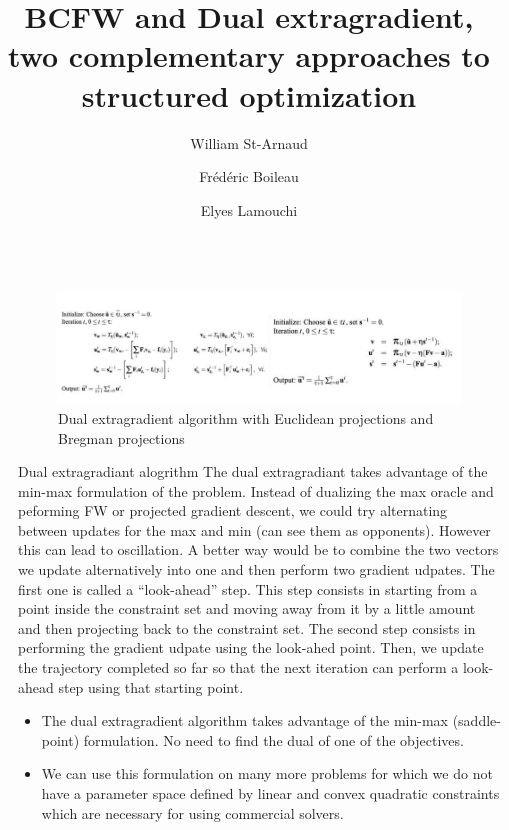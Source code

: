 \documentclass[final]{beamer}
\title{BCFW and Dual extragradient, two complementary approaches to structured optimization}
\author{William St-Arnaud\inst{1} \and Fr\'ed\'eric Boileau \inst{1} \and Elyes Lamouchi\inst{1}}
\institute[shortinst]{\inst{1} Universit\'e de Montr\'eal}
\newlength{\sepwidth}
\newlength{\colwidth}
\newcommand{\separatorcolumn}{\begin{column}{\sepwidth}\end{column}}
\begin{document}
\begin{frame}[t]
\begin{columns}[t]
\separatorcolumn

\begin{column}{\colwidth}

  \begin{block}{}

    \begin{figure}
      \includegraphics{img/extra_grad.jpg}
      \caption{Dual extragradient algorithm with Euclidean projections and Bregman projections}
      \label{extragrad}
    \end{figure}
  \end{block}


  \begin{block}{Dual extragradiant alogrithm}
    The dual extragradiant takes advantage of the min-max formulation of the
problem. Instead of dualizing the max oracle and peforming FW or projected
gradient descent, we could try alternating between updates for the max and min
(can see them as opponents). However this can lead to oscillation. A better way
would be to combine the two vectors we update alternatively into one and then
perform two gradient udpates. The first one is called a ``look-ahead'' step.
This step consists in starting from a point inside the constraint set and moving
away from it by a little amount and then projecting back to the constraint set.
The second step consists in performing the gradient udpate using the look-ahed
point. Then, we update the trajectory completed so far so that the next
iteration can perform a look-ahead step using that starting point.
    \begin{itemize}
      \item The dual extragradient algorithm takes advantage of the min-max
(saddle-point) formulation. No need to find the dual of one of the objectives.
      \item We can use this formulation on many more problems for which we do not have a parameter space defined
	by linear and convex quadratic constraints which are necessary for using commercial solvers.
    \end{itemize}


\end{block}
\end{column}
\end{columns}
\end{frame}
\end{document}
